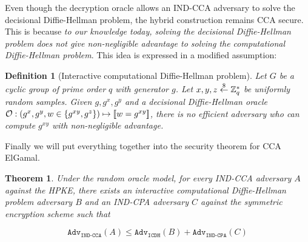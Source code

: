 \documentclass{article}
\newtheorem{definition}{Definition}[section]
\newtheorem{theorem}{Theorem}[section]
\begin{document}
Even though the decryption oracle allows an IND-CCA adversary to solve the decisional Diffie-Hellman problem, the hybrid construction remains CCA secure. This is because \emph{to our knowledge today, solving the decisional Diffie-Hellman problem does not give non-negligible advantage to solving the computational Diffie-Hellman problem}. This idea is expressed in a modified assumption:

\begin{definition}[Interactive computational Diffie-Hellman problem]
    Let $G$ be a cyclic group of prime order $q$ with generator $g$. Let $x, y, z \stackrel{\$}{\leftarrow} \mathbb{Z}_q^\ast$ be uniformly random samples. Given $g, g^x, g^y$ and a decisional Diffie-Hellman oracle $\mathcal{O}: (g^x, g^y, w \in \{g^{xy}, g^z\}) \mapsto [\![ w = g^{xy} ]\!]$, there is no efficient adversary who can compute $g^{xy}$ with non-negligible advantage.
\end{definition}

Finally we will put everything together into the security theorem for CCA ElGamal.

\begin{theorem}
    Under the random oracle model, for every IND-CCA adversary $A$ against the HPKE, there exists an \emph{interactive computational Diffie-Hellman problem} adversary $B$ and an IND-CPA adversary $C$ against the symmetric encryption scheme such that

    \begin{equation*}
        \texttt{Adv}_\texttt{IND-CCA}(A) \leq \texttt{Adv}_\texttt{ICDH}(B) + \texttt{Adv}_\texttt{IND-CPA}(C)
    \end{equation*}
\end{theorem}
\end{document}
